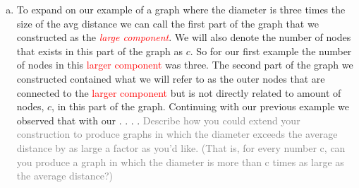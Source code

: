 \documentclass[11pt]{article}
\begin{document}
{\begin{enumerate}
\begin{enumerate}[(a)]
		\item To expand on our example of a graph where the diameter is three times the size of the avg distance we can call the first part of the graph that we constructed as the \textcolor{red}{\textit{large component}}. We will also denote the number of nodes that exists in this part of the graph as $c$.  So for our first example the number of nodes in this \textcolor{red}{larger component} was three.  The second part of the graph we constructed contained what we will refer to as the outer nodes that are connected to the \textcolor{red}{larger component} but is not directly related to amount of nodes, $c$, in this part of the graph.  Continuing with our previous example we observed that with our . . . . \textcolor{gray}{Describe how you could extend your construction to produce graphs in which the diameter exceeds the average distance by as large a factor as you’d like. (That is, for every number c, can you produce a graph in which the diameter is more than c times as large as the average distance?)}\\
	\end{enumerate}
\end{enumerate}
}
\end{document}
